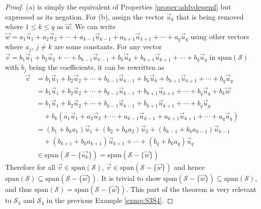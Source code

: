 \begin{proof}
(a) is simply the equivalent of Properties \ref{proper:addvdepend} but expressed as its negation. For (b), assign the vector $\vec{u}_k$ that is being removed where $1 \leq k \leq q$ as $\vec{w}$. We can write $\vec{w} = a_1\vec{u}_1 + a_2\vec{u}_2 + \cdots + a_{k-1}\vec{u}_{k-1} + a_{k+1}\vec{u}_{k+1} + \cdots + a_q\vec{u}_q$ using other vectors where $a_j$, $j \neq k$ are some constants. For any vector $\vec{v} = b_1\vec{u}_1 + b_2\vec{u}_2 + \cdots + b_{k-1}\vec{u}_{k-1} + b_k\vec{u}_k + b_{k+1}\vec{u}_{k+1} + \cdots + b_q\vec{u}_q$ in $\text{span}(\mathcal{S})$ with $b_j$ being the coefficients, it can be rewritten as
\begin{align*}
\vec{v} &= b_1\vec{u}_1 + b_2\vec{u}_2 + \cdots + b_{k-1}\vec{u}_{k-1} + b_k\vec{u}_k + b_{k+1}\vec{u}_{k+1} + \cdots + b_q\vec{u}_q \\
&= b_1\vec{u}_1 + b_2\vec{u}_2 + \cdots + b_{k-1}\vec{u}_{k-1} + b_{k+1}\vec{u}_{k+1} + \cdots + b_q\vec{u}_q + b_k\vec{w} \\
&= b_1\vec{u}_1 + b_2\vec{u}_2 + \cdots + b_{k-1}\vec{u}_{k-1} + b_{k+1}\vec{u}_{k+1} + \cdots + b_q\vec{u}_q \\
&\quad + b_k(a_1\vec{u}_1 + a_2\vec{u}_2 + \cdots + a_{k-1}\vec{u}_{k-1} + a_{k+1}\vec{u}_{k+1} + \cdots + a_q\vec{u}_q) \\
&= (b_1 + b_ka_1) \vec{u}_1 + (b_2 + b_ka_2) \vec{u}_2 + (b_{k-1} + b_ka_{k-1})\vec{u}_{k-1}  \\
&\quad + (b_{k+1} + b_ka_{k+1}) \vec{u}_{k+1} + \cdots + (b_q + b_ka_q)\vec{u}_q \\
&\in \text{span}(\mathcal{S} - \{\vec{u_k}\}) = \text{span}(\mathcal{S} - \{\vec{w}\})
\end{align*}
Therefore for all $\vec{v} \in \text{span}(\mathcal{S})$, $\vec{v} \in \text{span}(\mathcal{S} - \{\vec{w}\})$ and hence $\text{span}(\mathcal{S}) \subseteq \text{span}(\mathcal{S} - \{\vec{w}\})$. It is trivial to show $\text{span}(\mathcal{S} - \{\vec{w}\}) \subseteq \text{span}(\mathcal{S})$, and thus $\text{span}(\mathcal{S}) = \text{span}(\mathcal{S} - \{\vec{w}\})$. This part of the theorem is very relevant to $\mathcal{S}_3$ and $\mathcal{S}_4$ in the previous Example \ref{exmp:S3S4}.
\end{proof}


